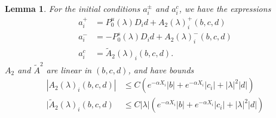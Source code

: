 \documentclass[10pt,reqno]{amsart}
\theoremstyle{plain}
\newtheorem{lemma}[theorem]{Lemma}
\theoremstyle{definition}
\theoremstyle{remark}
\numberwithin{theorem}{section}
\numberwithin{equation}{section}
\begin{document}
\begin{lemma}\label{lemma:aipm}
For the initial conditions $a_i^\pm$ and $a_i^c$, we have the expressions
\begin{equation}\label{aipmexp1}
\begin{aligned}
a_i^+ &= P_0^u(\lambda) D_i d + A_2(\lambda)_i^+(b, c, d) \\
a_i^- &= -P_0^s(\lambda) D_i d + A_2(\lambda)_i^-(b, c, d) \\
a_i^c &= \tilde{A}_2(\lambda)_i(b, c, d).
\end{aligned}
\end{equation}
$A_2$ and $\tilde{A}^2$ are linear in $(b, c, d)$, and have bounds
\begin{align}
|A_2(\lambda)_i(b, c, d)|
&\leq C \left(e^{-\alpha X_i}|b| + e^{-\alpha X_i}|c_i| + |\lambda|^2|d| \right) \label{A2bound} \\
|\tilde{A}_2(\lambda)_i(b, c, d) &\leq C |\lambda| \left( e^{-\alpha X_i} |b| + e^{-\alpha X_i} |c_i| +|\lambda|^2 |d| \right) \label{tildeA2bound}
\end{align}


\end{lemma}
\end{document}

